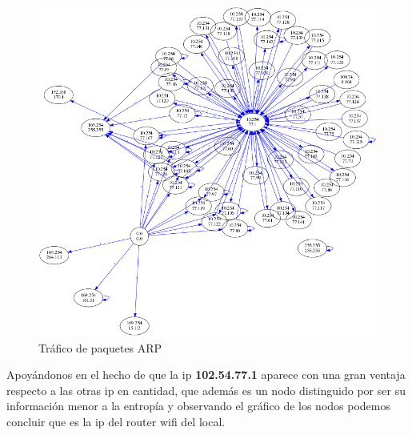 \begin{figure}[H]
       \centering
       \includegraphics[width=1\textwidth]{../resultados/Starbucks/network.png}
       \caption{Tráfico de paquetes ARP}
       \label{red-Starbucks-dst-information}
\end{figure}

Apoyándonos en el hecho de que la ip \textbf{102.54.77.1} aparece con una gran ventaja respecto a las otras ip en cantidad, que además es un nodo distinguido por ser su información menor a la entropía y observando el gráfico de los nodos podemos concluir que es la ip del router wifi del local.

